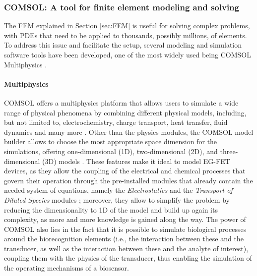 \subsubsection{COMSOL: A tool for finite element modeling and solving}
The FEM explained in Section \ref{sec:FEM} is useful for solving complex problems, with PDEs that need to be applied to thousands, possibly millions, of elements. To address this issue and facilitate the setup, several modeling and simulation software tools have been developed, one of the most widely used being COMSOL Multiphysics \citep{comsolCOMSOL_manual}.

\paragraph{Multiphysics}
COMSOL offers a multiphysics platform that allows users to simulate a wide range of physical phenomena by combining different physical models, including, but not limited to, electrochemistry, charge transport, heat transfer, fluid dynamics and many more \citep{comsolCOMSOL_manual}. Other than the physics modules, the COMSOL model builder allows to choose the most appropriate space dimension for the simulations, offering one-dimensional (1D), two-dimensional (2D), and three-dimensional (3D) models \citep{comsolCOMSOL_manual}. These features make it ideal to model EG-FET devices, as they allow the coupling of the electrical and chemical processes that govern their operation through the pre-installed modules that already contain the needed system of equations, namely the \emph{Electrostatics} and the \emph{Transport of Diluted Species} modules \citep{delavariNernst2021}; moreover, they allow to simplify the problem by reducing the dimensionality to 1D of the model and build up again its complexity, as more and more knowledge is gained along the way. The power of COMSOL also lies in the fact that it is possible to simulate biological processes around the biorecognition elements (i.e., the interaction between these and the transducer, as well as the interaction between these and the analyte of interest), coupling them with the physics of the transducer, thus enabling the simulation of the operating mechanisms of a biosensor.

